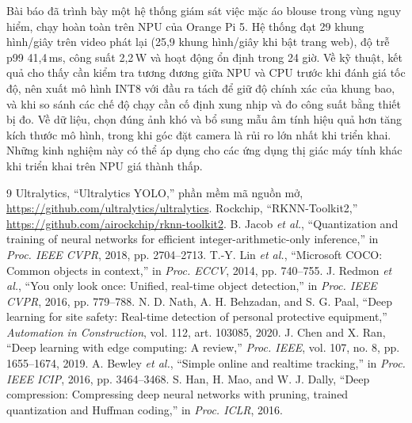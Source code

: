 \documentclass[11pt,a4paper,twocolumn]{article}
\begin{document}
Bài báo đã trình bày một hệ thống giám sát việc mặc áo blouse trong vùng nguy hiểm, chạy hoàn toàn trên NPU của Orange Pi 5. Hệ thống đạt 29 khung hình/giây trên video phát lại (25,9 khung
hình/giây khi bật trang web), độ trễ p99 41,4\,ms, công suất 2,2\,W và hoạt động ổn định trong 24 giờ. Về kỹ thuật, kết quả cho thấy cần kiểm tra tương đương giữa NPU và CPU trước khi đánh giá tốc độ,
nên xuất mô hình INT8 với đầu ra tách để giữ độ chính xác của khung bao, và khi so sánh các chế độ chạy cần cố định xung nhịp và đo công suất bằng thiết bị đo. Về dữ liệu, chọn đúng ảnh khó và bổ
sung mẫu âm tính hiệu quả hơn tăng kích thước mô hình, trong khi góc đặt camera là rủi ro lớn nhất khi triển khai. Những kinh nghiệm này có thể áp dụng cho các ứng dụng thị giác máy tính khác khi
triển khai trên NPU giá thành thấp.

\begin{thebibliography}{9}\footnotesize\setlength{\itemsep}{0pt}
 Ultralytics, ``Ultralytics YOLO,'' phần mềm mã nguồn mở, \url{https://github.com/ultralytics/ultralytics}.
 Rockchip, ``RKNN-Toolkit2,'' \url{https://github.com/airockchip/rknn-toolkit2}.
 B. Jacob \emph{et al.}, ``Quantization and training of neural networks for efficient integer-arithmetic-only inference,'' in \emph{Proc. IEEE CVPR}, 2018, pp. 2704--2713.
 T.-Y. Lin \emph{et al.}, ``Microsoft COCO: Common objects in context,'' in \emph{Proc. ECCV}, 2014, pp. 740--755.
 J. Redmon \emph{et al.}, ``You only look once: Unified, real-time object detection,'' in \emph{Proc. IEEE CVPR}, 2016, pp. 779--788.
 N. D. Nath, A. H. Behzadan, and S. G. Paal, ``Deep learning for site safety: Real-time detection of personal protective equipment,'' \emph{Automation in Construction}, vol. 112, art. 103085, 2020.
 J. Chen and X. Ran, ``Deep learning with edge computing: A review,'' \emph{Proc. IEEE}, vol. 107, no. 8, pp. 1655--1674, 2019.
 A. Bewley \emph{et al.}, ``Simple online and realtime tracking,'' in \emph{Proc. IEEE ICIP}, 2016, pp. 3464--3468.
 S. Han, H. Mao, and W. J. Dally, ``Deep compression: Compressing deep neural networks with pruning, trained quantization and Huffman coding,'' in \emph{Proc. ICLR}, 2016.
\end{thebibliography}
\end{document}
